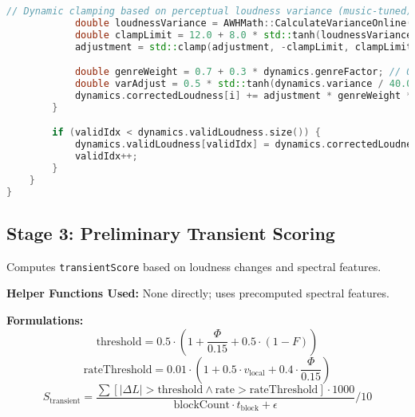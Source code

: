 \documentclass[11pt]{article}
\begin{document}
\begin{lstlisting}[language=C++]
			// Dynamic clamping based on perceptual loudness variance (music-tuned)
			double loudnessVariance = AWHMath::CalculateVarianceOnline(dynamics.validLoudness);
			double clampLimit = 12.0 + 8.0 * std::tanh(loudnessVariance / 25.0); // 12–20 dB
			adjustment = std::clamp(adjustment, -clampLimit, clampLimit);

			double genreWeight = 0.7 + 0.3 * dynamics.genreFactor; // 0.7–1.0, refined for music
			double varAdjust = 0.5 * std::tanh(dynamics.variance / 40.0); // Smoother music adaptation
			dynamics.correctedLoudness[i] += adjustment * genreWeight * (1.0 - varAdjust);
		}

		if (validIdx < dynamics.validLoudness.size()) {
			dynamics.validLoudness[validIdx] = dynamics.correctedLoudness[i];
			validIdx++;
		}
	}
}
\end{lstlisting}

\subsection{Stage 3: Preliminary Transient Scoring}
Computes \texttt{transientScore} based on loudness changes and spectral features.

\textbf{Helper Functions Used:} None directly; uses precomputed spectral features.

\textbf{Formulations:}
\begin{equation}
\text{threshold} = 0.5 \cdot \left(1 + \frac{\Phi}{0.15} + 0.5 \cdot (1 - F)\right)
\end{equation}
\begin{equation}
\text{rateThreshold} = 0.01 \cdot \left(1 + 0.5 \cdot v_{\text{local}} + 0.4 \cdot \frac{\Phi}{0.15}\right)
\end{equation}
\begin{equation}
S_{\text{transient}} = \frac{\sum [|\Delta L| > \text{threshold} \land \text{rate} > \text{rateThreshold}] \cdot 1000}{\text{blockCount} \cdot t_{\text{block}} + \epsilon} / 10
\end{equation}
\end{document}
